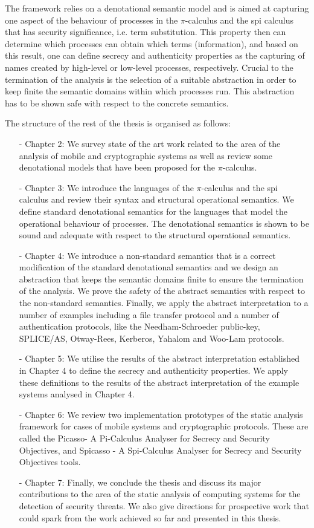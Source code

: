 \documentclass[10pt,a4paper,final,oneside,fleqn]{book}
\begin{document}
The framework relies on a denotational semantic model and is aimed at capturing one aspect of the behaviour of processes in the $\pi$-calculus and the spi calculus that has security significance, i.e. term substitution. This property then can determine which processes can obtain which terms (information), and based on this result, one can define secrecy and authenticity properties as the capturing of names created by high-level or low-level processes, respectively.  Crucial to the termination of the analysis is the selection of a suitable abstraction in order to keep finite the semantic domains within which processes run. This abstraction has to be shown safe with respect to the concrete semantics.

The structure of the rest of the thesis is organised as follows:
\begin{itemize}
\item[-]
Chapter 2: We survey state of the art work related to the area of the analysis of mobile and cryptographic systems as well as review some denotational models that have been proposed for the $\pi$-calculus.
\item[-]
Chapter 3: We introduce the languages of the $\pi$-calculus and the spi calculus and review their syntax and structural operational semantics.  We define standard denotational semantics for the languages that model the operational behaviour of processes.  The denotational semantics is shown to be sound and adequate with respect to the structural operational semantics.
\item[-]
Chapter 4: We introduce a non-standard semantics that is a correct modification of the standard denotational semantics and we design an abstraction that keeps the semantic domains finite to ensure the termination of the analysis.  We prove the safety of the abstract semantics with respect to the non-standard semantics. Finally, we apply the abstract interpretation to a number of examples including a file transfer protocol and a number of authentication protocols, like the Needham-Schroeder public-key, SPLICE/AS, Otway-Rees, Kerberos, Yahalom and Woo-Lam protocols.
\item[-]
Chapter 5: We utilise the results of the abstract interpretation established in Chapter 4 to define the secrecy and authenticity properties. We apply these definitions to the results of the abstract interpretation of the example systems analysed in Chapter 4.
\item[-]
Chapter 6: We review two implementation prototypes of the static analysis framework for cases of mobile systems and cryptographic protocols.  These are called the Picasso- A Pi-Calculus Analyser for Secrecy and Security Objectives, and Spicasso - A Spi-Calculus Analyser for Secrecy and Security Objectives tools.
\item[-]
Chapter 7: Finally, we conclude the thesis and discuss its major contributions to the area of the static analysis of computing systems for the detection of security threats. We also give directions for prospective work that could spark from the work achieved so far and presented in this thesis.
\end{itemize}
\end{document}
